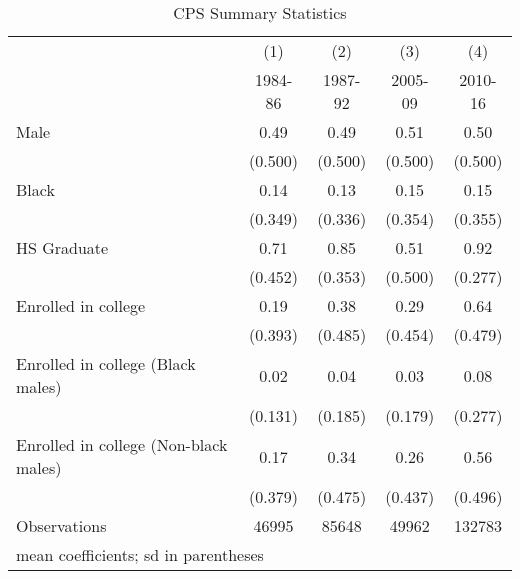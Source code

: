 \begin{table}[htbp]\centering
\caption{CPS Summary Statistics }
\begin{tabular}{l*{4}{c}}
\hline\hline
                    &\multicolumn{1}{c}{(1)}&\multicolumn{1}{c}{(2)}&\multicolumn{1}{c}{(3)}&\multicolumn{1}{c}{(4)}\\
                    &\multicolumn{1}{c}{1984-86}&\multicolumn{1}{c}{1987-92}&\multicolumn{1}{c}{2005-09}&\multicolumn{1}{c}{2010-16}\\
\hline
Male                &        0.49&        0.49&        0.51&        0.50\\
                    &     (0.500)&     (0.500)&     (0.500)&     (0.500)\\
[1em]
Black               &        0.14&        0.13&        0.15&        0.15\\
                    &     (0.349)&     (0.336)&     (0.354)&     (0.355)\\
[1em]
HS Graduate         &        0.71&        0.85&        0.51&        0.92\\
                    &     (0.452)&     (0.353)&     (0.500)&     (0.277)\\
[1em]
Enrolled in college &        0.19&        0.38&        0.29&        0.64\\
                    &     (0.393)&     (0.485)&     (0.454)&     (0.479)\\
[1em]
Enrolled in college (Black males)&        0.02&        0.04&        0.03&        0.08\\
                    &     (0.131)&     (0.185)&     (0.179)&     (0.277)\\
[1em]
Enrolled in college (Non-black males)&        0.17&        0.34&        0.26&        0.56\\
                    &     (0.379)&     (0.475)&     (0.437)&     (0.496)\\
\hline
Observations        &       46995&       85648&       49962&      132783\\
\hline\hline
\multicolumn{5}{l}{\footnotesize mean coefficients; sd in parentheses}\\
\end{tabular}
\end{table}
